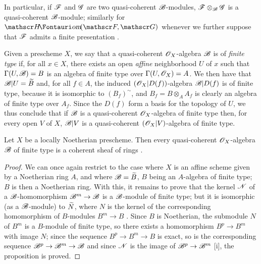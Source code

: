 In particular, if $\mathscr{F}$ and $\mathscr{G}$ are two quasi-coherent $\mathscr{B}$-modules, $\mathscr{F}\otimes_{\mathscr{B}}\mathscr{G}$ is a quasi-coherent $\mathscr{B}$-module; similarly for $\shHom(\sh{F},\sh{G})$ whenever we further suppose that $\mathscr{F}$ admits a finite presentation .

\begin{env}[9.6.2]
\label{1.9.6.2}
Given a prescheme $X$, we say that a quasi-coherent $\mathscr{O}_X$-algebra $\mathscr{B}$ is of \emph{finite type} if, for all $x\in X$, there exists an open \emph{affine} neighborhood $U$ of $x$ such that $\Gamma(U,\mathscr{B})=B$ is an algebra of finite type over $\Gamma(U,\mathscr{O}_X)=A$.
We then have that $\mathscr{B}|U={\widetilde{B}}$ and, for all $f\in A$, the induced $(\mathscr{O}_X|D(f))$-algebra $\mathscr{B}|D(f)$ is of finite type, because it is isomorphic to $(B_f)^{\sim}$, and $B_f=B\otimes_A A_f$ is clearly an algebra of finite type over $A_f$.
Since the $D(f)$ form a basis for the topology of $U$, we thus conclude that if $\mathscr{B}$ is a quasi-coherent $\mathscr{O}_X$-algebra of finite type then, for every open $V$ of $X$, $\mathscr{B}|V$ is a quasi-coherent $(\mathscr{O}_X|V)$-algebra of finite type.
\end{env}

\begin{prop}[9.6.3]
\label{1.9.6.3}
Let $X$ be a locally Noetherian prescheme.
Then every quasi-coherent $\mathscr{O}_X$-algebra $\mathscr{B}$ of finite type is a coherent sheaf of rings .
\end{prop}

\begin{proof}
\label{proof-1.9.6.3}
We can once again restrict to the case where $X$ is an affine scheme given by a Noetherian ring $A$, and where $\mathscr{B}={\widetilde{B}}$, $B$ being an $A$-algebra of finite type; $B$ is then a Noetherian ring.
With this, it remains to prove that the kernel $\mathscr{N}$ of a $\mathscr{B}$-homomorphism $\sh{B}^m\to\sh{B}$ is a $\mathscr{B}$-module of finite type; but it is isomorphic (as a $\mathscr{B}$-module) to ${\widetilde{N}}$, where $N$ is the kernel of the corresponding homomorphism of $B$-modules $B^m\to B$ .
Since $B$ is Noetherian, the submodule $N$ of $B^m$ is a $B$-module of finite type, so there exists a homomorphism $B^p\to B^m$ with image $N$; since the sequence $B^p\to B^m\to B$ is exact, so is the corresponding sequence $\sh{B}^p\to\sh{B}^m\to\sh{B}$  and since $\mathscr{N}$ is the image of $\sh{B}^p\to\sh{B}^m$ [i], the proposition is proved.
\end{proof}

